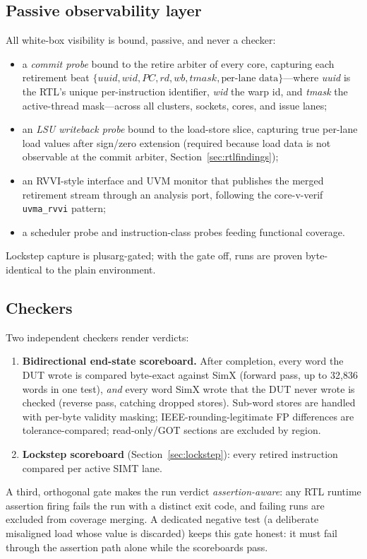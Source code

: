\documentclass[conference]{IEEEtran}
\newcommand{\code}[1]{\texttt{\small #1}}
\begin{document}
\subsection{Passive observability layer}
All white-box visibility is bound, passive, and never a checker:
\begin{itemize}
\item a \emph{commit probe} bound to the retire arbiter of every core,
capturing each retirement beat
$\{\textit{uuid}, \textit{wid}, \textit{PC}, \textit{rd},
\textit{wb}, \textit{tmask}, \text{per-lane data}\}$---where
\textit{uuid} is the RTL's unique per-instruction identifier,
\textit{wid} the warp id, and \textit{tmask} the active-thread
mask---across all clusters, sockets, cores, and issue lanes;
\item an \emph{LSU writeback probe} bound to the load-store slice,
capturing true per-lane load values after sign/zero extension
(required because load data is not observable at the commit arbiter,
Section~\ref{sec:rtlfindings});
\item an RVVI-style interface and UVM monitor that publishes the merged
retirement stream through an analysis port, following the
core-v-verif \code{uvma\_rvvi} pattern;
\item a scheduler probe and instruction-class probes feeding functional
coverage.
\end{itemize}
Lockstep capture is plusarg-gated; with the gate off, runs are proven
byte-identical to the plain environment.

\subsection{Checkers}
Two independent checkers render verdicts:
\begin{enumerate}
\item \textbf{Bidirectional end-state scoreboard.} After completion,
every word the DUT wrote is compared byte-exact against SimX
(forward pass, up to 32{,}836 words in one test), \emph{and} every
word SimX wrote that the DUT never wrote is checked (reverse pass,
catching dropped stores). Sub-word stores are handled with per-byte
validity masking; IEEE-rounding-legitimate FP differences are
tolerance-compared; read-only/GOT sections are excluded by region.
\item \textbf{Lockstep scoreboard} (Section~\ref{sec:lockstep}): every
retired instruction compared per active SIMT lane.
\end{enumerate}
A third, orthogonal gate makes the run verdict \emph{assertion-aware}:
any RTL runtime assertion firing fails the run with a distinct exit
code, and failing runs are excluded from coverage merging. A dedicated
negative test (a deliberate misaligned load whose value is discarded)
keeps this gate honest: it must fail through the assertion path alone
while the scoreboards pass.
\end{document}
